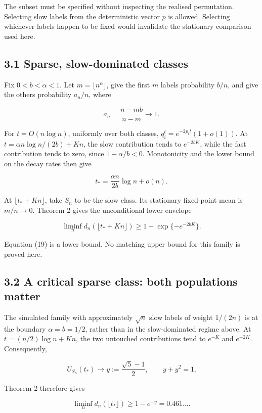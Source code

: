 \documentclass[
  british,
  11pt,
]{article}
\begin{document}
The subset must be specified without inspecting the realised
permutation. Selecting slow labels from the deterministic vector \(p\)
is allowed. Selecting whichever labels happen to be fixed would
invalidate the stationary comparison used here.

\subsection{3.1 Sparse, slow-dominated
classes}\label{sparse-slow-dominated-classes}

Fix \(0<b<\alpha<1\). Let \(m=\lfloor n^\alpha\rfloor\), give the first
\(m\) labels probability \(b/n\), and give the others probability
\(a_n/n\), where

\[a_n=\frac{n-mb}{n-m}\longrightarrow1.\]

For \(t=O(n\log n)\), uniformly over both classes,
\(q_i^t=e^{-2p_it}(1+o(1))\). At \(t=\alpha n\log n/(2b)+Kn\), the slow
contribution tends to \(e^{-2bK}\), while the fast contribution tends to
zero, since \(1-\alpha/b<0\). Monotonicity and the lower bound on the
decay rates then give

\[t_*=\frac{\alpha n}{2b}\log n+o(n).\]

At \(\lfloor t_*+Kn\rfloor\), take \(S_n\) to be the slow class. Its
stationary fixed-point mean is \(m/n\to0\). Theorem 2 gives the
unconditional lower envelope

\[
\liminf_n d_n(\lfloor t_*+Kn\rfloor)
\ge1-\exp\{-e^{-2bK}\}. \tag{19}
\]

Equation (19) is a lower bound. No matching upper bound for this family
is proved here.

\subsection{3.2 A critical sparse class: both populations
matter}\label{a-critical-sparse-class-both-populations-matter}

The simulated family with approximately \(\sqrt n\) slow labels of
weight \(1/(2n)\) is at the boundary \(\alpha=b=1/2\), rather than in
the slow-dominated regime above. At \(t=(n/2)\log n+Kn\), the two
untouched contributions tend to \(e^{-K}\) and \(e^{-2K}\).
Consequently,

\[
U_{S_n}(t_*)\longrightarrow y:=\frac{\sqrt5-1}{2},
\qquad y+y^2=1.
\]

Theorem 2 therefore gives

\[\liminf_n d_n(\lfloor t_*\rfloor)\ge1-e^{-y}=0.461\ldots.\]
\end{document}
